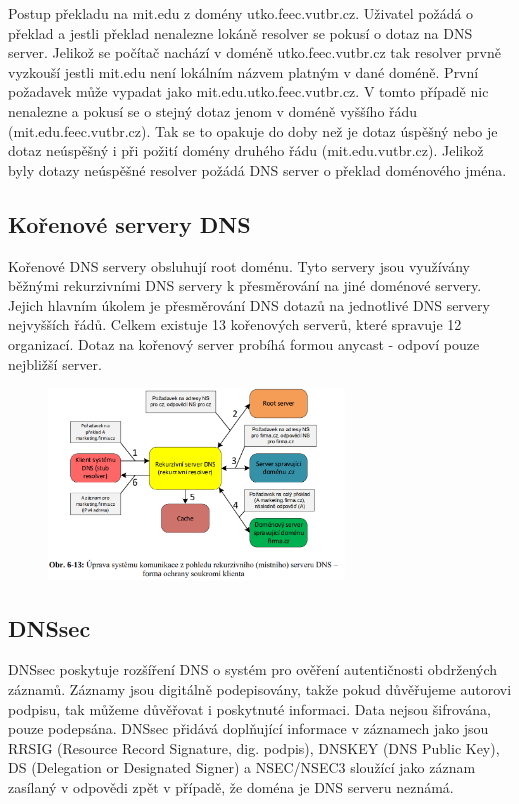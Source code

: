 Postup překladu na mit.edu z domény utko.feec.vutbr.cz.
Uživatel požádá o překlad a jestli překlad nenalezne lokáně resolver se pokusí o dotaz na DNS server.
Jelikož se počítač nachází v doméně utko.feec.vutbr.cz tak resolver prvně vyzkouší jestli mit.edu není lokálním názvem platným v dané doméně.
První požadavek může vypadat jako mit.edu.utko.feec.vutbr.cz.
V tomto případě nic nenalezne a pokusí se o stejný dotaz jenom v doméně vyššího řádu (mit.edu.feec.vutbr.cz).
Tak se to opakuje do doby než je dotaz úspěšný nebo je dotaz neúspěšný i při požití domény druhého řádu (mit.edu.vutbr.cz).
Jelikož byly dotazy neúspěšné resolver požádá DNS server o překlad doménového jména.

\subsection{Kořenové servery DNS}

Kořenové DNS servery obsluhují root doménu.
Tyto servery jsou využívány běžnými rekurzivními DNS servery k přesměrování na jiné doménové servery.
Jejich hlavním úkolem je přesměrování DNS dotazů na jednotlivé DNS servery nejvyšších řádů.
Celkem existuje 13 kořenových serverů, které spravuje 12 organizací.
Dotaz na kořenový server probíhá formou anycast - odpoví pouze nejbližší server.

\begin{figure}[!h]
    \centering
    \includegraphics[width=0.7\textwidth]{obrazky/040.png}
\end{figure}

\subsection{DNSsec}

DNSsec poskytuje rozšíření DNS o systém pro ověření autentičnosti obdržených záznamů.
Záznamy jsou digitálně podepisovány, takže pokud důvěřujeme autorovi podpisu, tak můžeme důvěřovat i poskytnuté informaci.
Data nejsou šifrována, pouze podepsána.
DNSsec přidává doplňující informace v záznamech jako jsou RRSIG (Resource Record Signature, dig. podpis), DNSKEY (DNS Public Key), DS (Delegation or Designated Signer) a NSEC/NSEC3 sloužící jako záznam zasílaný v odpovědi zpět v případě, že doména je DNS serveru neznámá.






